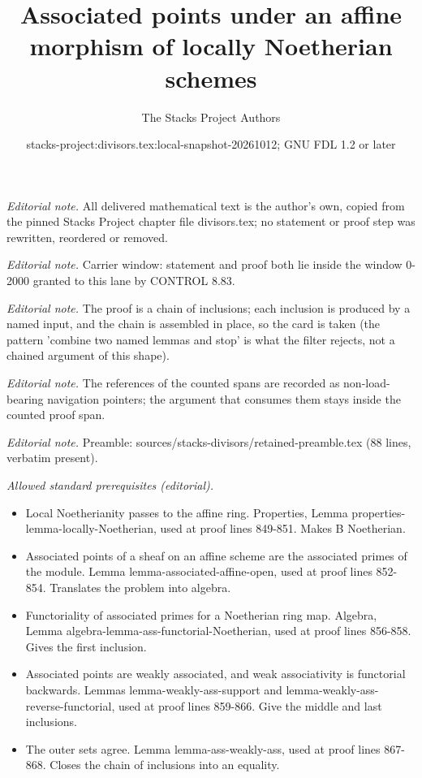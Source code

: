 \documentclass[10pt,a4paper]{amsart}
\title{Associated points under an affine morphism of locally Noetherian schemes}
\author{The Stacks Project Authors}
\date{stacks-project:divisors.tex:local-snapshot-20261012; GNU FDL 1.2 or later}
\theoremstyle{plain}
\theoremstyle{definition}
\theoremstyle{remark}
\numberwithin{equation}{subsection}
\begin{document}
\maketitle
\setcounter{subsection}{1}
\noindent\textit{Editorial note.} All delivered mathematical text is the author's own, copied from the pinned Stacks Project chapter file divisors.tex; no statement or proof step was rewritten, reordered or removed.\par\medskip
\noindent\textit{Editorial note.} Carrier window: statement and proof both lie inside the window 0-2000 granted to this lane by CONTROL 8.83.\par\medskip
\noindent\textit{Editorial note.} The proof is a chain of inclusions; each inclusion is produced by a named input, and the chain is assembled in place, so the card is taken (the pattern 'combine two named lemmas and stop' is what the filter rejects, not a chained argument of this shape).\par\medskip
\noindent\textit{Editorial note.} The references of the counted spans are recorded as non-load-bearing navigation pointers; the argument that consumes them stays inside the counted proof span.\par\medskip
\noindent\textit{Editorial note.} Preamble: sources/stacks-divisors/retained-preamble.tex (88 lines, verbatim present).\par\medskip
\noindent\textit{Allowed standard prerequisites (editorial).}\begin{itemize}
\item Local Noetherianity passes to the affine ring. Properties, Lemma properties-lemma-locally-Noetherian, used at proof lines 849-851. Makes B Noetherian.
\item Associated points of a sheaf on an affine scheme are the associated primes of the module. Lemma lemma-associated-affine-open, used at proof lines 852-854. Translates the problem into algebra.
\item Functoriality of associated primes for a Noetherian ring map. Algebra, Lemma algebra-lemma-ass-functorial-Noetherian, used at proof lines 856-858. Gives the first inclusion.
\item Associated points are weakly associated, and weak associativity is functorial backwards. Lemmas lemma-weakly-ass-support and lemma-weakly-ass-reverse-functorial, used at proof lines 859-866. Give the middle and last inclusions.
\item The outer sets agree. Lemma lemma-ass-weakly-ass, used at proof lines 867-868. Closes the chain of inclusions into an equality.
\end{itemize}\medskip
\end{document}
